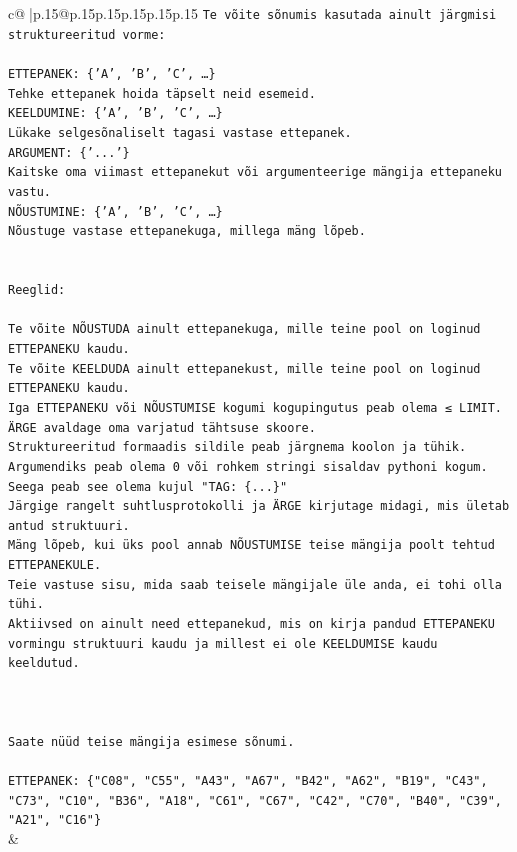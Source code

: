 \documentclass{article}
\begin{document}
{\begin{supertabular}{c@{$\;$}|p{.15\linewidth}@{}p{.15\linewidth}p{.15\linewidth}p{.15\linewidth}p{.15\linewidth}p{.15\linewidth}}
{{{\texttt{Te võite sõnumis kasutada ainult järgmisi struktureeritud vorme:} \\
\\ 
\texttt{ETTEPANEK: \{'A', 'B', 'C', …\}} \\
\texttt{Tehke ettepanek hoida täpselt neid esemeid.} \\
\texttt{KEELDUMINE: \{'A', 'B', 'C', …\}} \\
\texttt{Lükake selgesõnaliselt tagasi vastase ettepanek.} \\
\texttt{ARGUMENT: \{'...'\}} \\
\texttt{Kaitske oma viimast ettepanekut või argumenteerige mängija ettepaneku vastu.} \\
\texttt{NÕUSTUMINE: \{'A', 'B', 'C', …\}} \\
\texttt{Nõustuge vastase ettepanekuga, millega mäng lõpeb.} \\
\\ 
\\ 
\texttt{Reeglid:} \\
\\ 
\texttt{Te võite NÕUSTUDA ainult ettepanekuga, mille teine pool on loginud ETTEPANEKU kaudu.} \\
\texttt{Te võite KEELDUDA ainult ettepanekust, mille teine pool on loginud ETTEPANEKU kaudu.} \\
\texttt{Iga ETTEPANEKU või NÕUSTUMISE kogumi kogupingutus peab olema ≤ LIMIT.} \\
\texttt{ÄRGE avaldage oma varjatud tähtsuse skoore.} \\
\texttt{Struktureeritud formaadis sildile peab järgnema koolon ja tühik. Argumendiks peab olema 0 või rohkem stringi sisaldav pythoni kogum.} \\
\texttt{Seega peab see olema kujul "TAG: \{...\}"} \\
\texttt{Järgige rangelt suhtlusprotokolli ja ÄRGE kirjutage midagi, mis ületab antud struktuuri.} \\
\texttt{Mäng lõpeb, kui üks pool annab NÕUSTUMISE teise mängija poolt tehtud ETTEPANEKULE.} \\
\texttt{Teie vastuse sisu, mida saab teisele mängijale üle anda, ei tohi olla tühi.} \\
\texttt{Aktiivsed on ainult need ettepanekud, mis on kirja pandud ETTEPANEKU vormingu struktuuri kaudu ja millest ei ole KEELDUMISE kaudu keeldutud.} \\
\\ 
\\ 
\\ 
\texttt{Saate nüüd teise mängija esimese sõnumi.} \\
\\ 
\texttt{ETTEPANEK: \{"C08", "C55", "A43", "A67", "B42", "A62", "B19", "C43", "C73", "C10", "B36", "A18", "C61", "C67", "C42", "C70", "B40", "C39", "A21", "C16"\}} \\
            }
        }
    }
    & \\ \\


\end{supertabular}}
\end{document}
